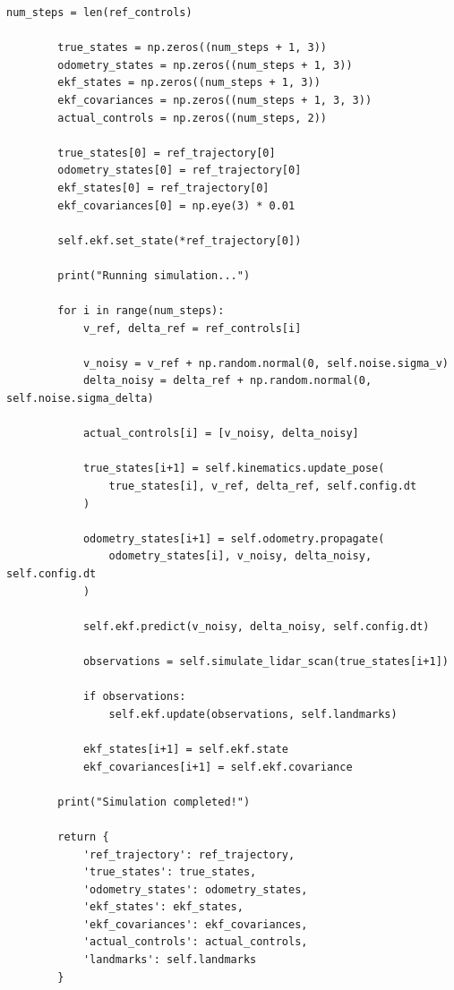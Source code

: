 \documentclass[12pt,a4paper]{report}
\begin{document}
\begin{lstlisting}[caption={Complete Simulation System (complete\_simulation.py)}]
        num_steps = len(ref_controls)
        
        true_states = np.zeros((num_steps + 1, 3))
        odometry_states = np.zeros((num_steps + 1, 3))
        ekf_states = np.zeros((num_steps + 1, 3))
        ekf_covariances = np.zeros((num_steps + 1, 3, 3))
        actual_controls = np.zeros((num_steps, 2))
        
        true_states[0] = ref_trajectory[0]
        odometry_states[0] = ref_trajectory[0]
        ekf_states[0] = ref_trajectory[0]
        ekf_covariances[0] = np.eye(3) * 0.01
        
        self.ekf.set_state(*ref_trajectory[0])
        
        print("Running simulation...")
        
        for i in range(num_steps):
            v_ref, delta_ref = ref_controls[i]
            
            v_noisy = v_ref + np.random.normal(0, self.noise.sigma_v)
            delta_noisy = delta_ref + np.random.normal(0, self.noise.sigma_delta)
            
            actual_controls[i] = [v_noisy, delta_noisy]
            
            true_states[i+1] = self.kinematics.update_pose(
                true_states[i], v_ref, delta_ref, self.config.dt
            )
            
            odometry_states[i+1] = self.odometry.propagate(
                odometry_states[i], v_noisy, delta_noisy, self.config.dt
            )
            
            self.ekf.predict(v_noisy, delta_noisy, self.config.dt)
            
            observations = self.simulate_lidar_scan(true_states[i+1])
            
            if observations:
                self.ekf.update(observations, self.landmarks)
            
            ekf_states[i+1] = self.ekf.state
            ekf_covariances[i+1] = self.ekf.covariance
        
        print("Simulation completed!")
        
        return {
            'ref_trajectory': ref_trajectory,
            'true_states': true_states,
            'odometry_states': odometry_states,
            'ekf_states': ekf_states,
            'ekf_covariances': ekf_covariances,
            'actual_controls': actual_controls,
            'landmarks': self.landmarks
        }



\end{lstlisting}
\end{document}
